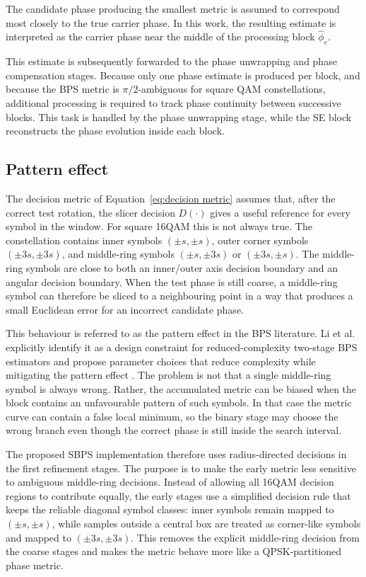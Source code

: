 The candidate phase producing the smallest metric is assumed to correspond most closely to the true carrier phase. In this work, the resulting estimate is interpreted as the carrier phase near the middle of the processing block $ \hat{\phi}_e $.

This estimate is subsequently forwarded to the phase unwrapping and phase compensation stages. Because only one phase estimate is produced per block, and because the \ac{BPS} metric is $\pi/2$-ambiguous for square \ac{QAM} constellations, additional processing is required to track phase continuity between successive blocks. This task is handled by the phase unwrapping stage, while the \ac{SE} block reconstructs the phase evolution inside each block.

\subsection{Pattern effect}\label{subsec:sbps-pattern-effect}

The decision metric of Equation~\ref{eq:decision metric} assumes that, after the correct test rotation, the slicer decision \(D(\cdot)\) gives a useful reference for every symbol in the window. For square 16QAM this is not always true. The constellation contains inner symbols \((\pm s,\pm s)\), outer corner symbols \((\pm 3s,\pm 3s)\), and middle-ring symbols \((\pm s,\pm 3s)\) or \((\pm 3s,\pm s)\). The middle-ring symbols are close to both an inner/outer axis decision boundary and an angular decision boundary. When the test phase is still coarse, a middle-ring symbol can therefore be sliced to a neighbouring point in a way that produces a small Euclidean error for an incorrect candidate phase.

This behaviour is referred to as the pattern effect in the \ac{BPS} literature. Li et al. explicitly identify it as a design constraint for reduced-complexity two-stage \ac{BPS} estimators and propose parameter choices that reduce complexity while mitigating the pattern effect \cite{Li2011JLT}. The problem is not that a single middle-ring symbol is always wrong. Rather, the accumulated metric can be biased when the block contains an unfavourable pattern of such symbols. In that case the metric curve can contain a false local minimum, so the binary stage may choose the wrong branch even though the correct phase is still inside the search interval.

The proposed \ac{SBPS} implementation therefore uses radius-directed decisions in the first refinement stages. The purpose is to make the early metric less sensitive to ambiguous middle-ring decisions. Instead of allowing all 16QAM decision regions to contribute equally, the early stages use a simplified decision rule that keeps the reliable diagonal symbol classes: inner symbols remain mapped to \((\pm s,\pm s)\), while samples outside a central box are treated as corner-like symbols and mapped to \((\pm 3s,\pm 3s)\). This removes the explicit middle-ring decision from the coarse stages and makes the metric behave more like a \ac{QPSK}-partitioned phase metric.

